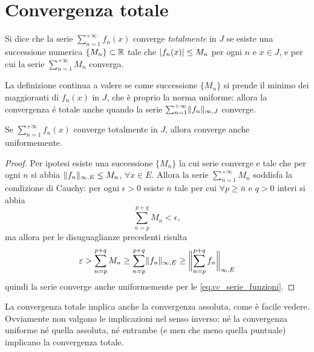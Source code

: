 \section{Convergenza totale}
\begin{definizione}
Si dice che la serie $\sum_{n=1}^{+\infty}f_n(x)$ converge \emph{totalmente} in $J$ se esiste una successione numerica $\{M_n\}\subset\R$ tale che $\abs{f_n(x)}\leq M_n$ per ogni $n$ e $x\in J$, e per cui la serie $\sum_{n=1}^{+\infty}M_n$ converga.
\end{definizione}
La definizione continua a valere se come successione $\{M_n\}$ si prende il minimo dei maggioranti di $f_n(x)$ in $J$, che è proprio la norma uniforme: allora la convergenza é totale anche quando la serie $\sum_{n=1}^{+\infty}\norm{f_n}_{\infty,J}$ converge.
\begin{teorema}[di Weierstrass]
Se $\sum_{n=1}^{+\infty}f_n(x)$ converge totalmente in $J$, allora converge anche uniformemente.
\end{teorema}
\begin{proof}
Per ipotesi esiste una successione $\{M_n\}$ la cui serie converge e tale che per ogni $n$ si abbia $\norm{f_n}_{\infty,E}\leq M_n$, $\forall x\in E$. Allora la serie $\sum_{n=1}^{+\infty}M_n$ soddisfa la condizione di Cauchy: per ogni $\epsilon>0$ esiste $\overline{n}$ tale per cui $\forall p\geq\overline{n}$ e $q>0$ interi si abbia
\[
\sum_{n=p}^{p+q}M_n<\epsilon,
\]
ma allora per le disuguaglianze precedenti risulta
\[
	\epsilon>\sum_{n=p}^{p+q}M_n\geq\sum_{n=p}^{p+q}\norm{f_n}_{\infty,E}\geq\norm[\bigg]{\sum_{n=p}^{p+q}f_n}_{\infty,E}
\]
quindi la serie converge anche uniformemente per le \eqref{eq:cc_serie_funzioni}.
\end{proof}
La convergenza totale implica anche la convergenza assoluta, come è facile vedere. Ovviamente non valgono le implicazioni nel senso inverso: né la convergenza uniforme né quella assoluta, né entrambe (e men che meno quella puntuale) implicano la convergenza totale.
